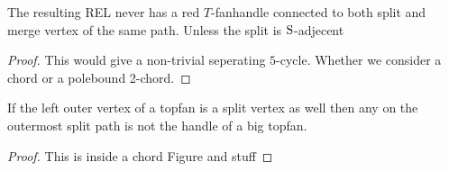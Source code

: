     \begin{lemma}
      \label{lm:uni:noTfan above whole path}
      The resulting REL never has a red $T$-fanhandle connected to both split and merge vertex of the same path. Unless the split is $\mathrm{S}$-adjecent
    \end{lemma}
    \begin{proof}
        This would give a non-trivial seperating $5$-cycle. Whether we consider a chord or a polebound 2-chord.
    \end{proof}

    \begin{lemma}
      \label{lm:sweep:NoTwoSplitsAboveEachOther}
      If the left outer vertex of a topfan is a split vertex as well then any on the outermost split path is not the handle of a big topfan.
    \end{lemma}

    \begin{proof}
      This is inside a chord Figure and stuff
    \end{proof}
